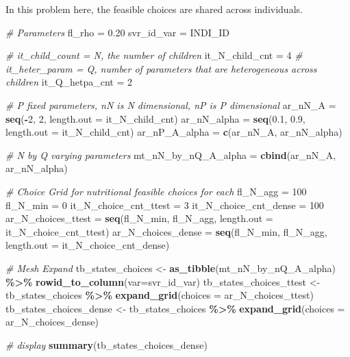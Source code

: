 \documentclass[
]{book}
\newenvironment{Shaded}{\begin{snugshade}}{\end{snugshade}}
\newcommand{\CommentTok}[1]{\textcolor[rgb]{0.56,0.35,0.01}{\textit{#1}}}
\newcommand{\DataTypeTok}[1]{\textcolor[rgb]{0.13,0.29,0.53}{#1}}
\newcommand{\DecValTok}[1]{\textcolor[rgb]{0.00,0.00,0.81}{#1}}
\newcommand{\FloatTok}[1]{\textcolor[rgb]{0.00,0.00,0.81}{#1}}
\newcommand{\KeywordTok}[1]{\textcolor[rgb]{0.13,0.29,0.53}{\textbf{#1}}}
\newcommand{\NormalTok}[1]{#1}
\newcommand{\OperatorTok}[1]{\textcolor[rgb]{0.81,0.36,0.00}{\textbf{#1}}}
\newcommand{\StringTok}[1]{\textcolor[rgb]{0.31,0.60,0.02}{#1}}
\begin{document}
In this problem here, the feasible choices are shared across individuals.

\begin{Shaded}
\begin{Highlighting}[]
\CommentTok{\# Parameters}
\NormalTok{fl\_rho =}\StringTok{ }\FloatTok{0.20}
\NormalTok{svr\_id\_var =}\StringTok{ \textquotesingle{}INDI\_ID\textquotesingle{}}

\CommentTok{\# it\_child\_count = N, the number of children}
\NormalTok{it\_N\_child\_cnt =}\StringTok{ }\DecValTok{4}
\CommentTok{\# it\_heter\_param = Q, number of parameters that are heterogeneous across children}
\NormalTok{it\_Q\_hetpa\_cnt =}\StringTok{ }\DecValTok{2}

\CommentTok{\# P fixed parameters, nN is N dimensional, nP is P dimensional}
\NormalTok{ar\_nN\_A =}\StringTok{ }\KeywordTok{seq}\NormalTok{(}\OperatorTok{{-}}\DecValTok{2}\NormalTok{, }\DecValTok{2}\NormalTok{, }\DataTypeTok{length.out =}\NormalTok{ it\_N\_child\_cnt)}
\NormalTok{ar\_nN\_alpha =}\StringTok{ }\KeywordTok{seq}\NormalTok{(}\FloatTok{0.1}\NormalTok{, }\FloatTok{0.9}\NormalTok{, }\DataTypeTok{length.out =}\NormalTok{ it\_N\_child\_cnt)}
\NormalTok{ar\_nP\_A\_alpha =}\StringTok{ }\KeywordTok{c}\NormalTok{(ar\_nN\_A, ar\_nN\_alpha)}

\CommentTok{\# N by Q varying parameters}
\NormalTok{mt\_nN\_by\_nQ\_A\_alpha =}\StringTok{ }\KeywordTok{cbind}\NormalTok{(ar\_nN\_A, ar\_nN\_alpha)}

\CommentTok{\# Choice Grid for nutritional feasible choices for each}
\NormalTok{fl\_N\_agg =}\StringTok{ }\DecValTok{100}
\NormalTok{fl\_N\_min =}\StringTok{ }\DecValTok{0}
\NormalTok{it\_N\_choice\_cnt\_ttest =}\StringTok{ }\DecValTok{3}
\NormalTok{it\_N\_choice\_cnt\_dense =}\StringTok{ }\DecValTok{100}
\NormalTok{ar\_N\_choices\_ttest =}\StringTok{ }\KeywordTok{seq}\NormalTok{(fl\_N\_min, fl\_N\_agg, }\DataTypeTok{length.out =}\NormalTok{ it\_N\_choice\_cnt\_ttest)}
\NormalTok{ar\_N\_choices\_dense =}\StringTok{ }\KeywordTok{seq}\NormalTok{(fl\_N\_min, fl\_N\_agg, }\DataTypeTok{length.out =}\NormalTok{ it\_N\_choice\_cnt\_dense)}

\CommentTok{\# Mesh Expand}
\NormalTok{tb\_states\_choices \textless{}{-}}\StringTok{ }\KeywordTok{as\_tibble}\NormalTok{(mt\_nN\_by\_nQ\_A\_alpha) }\OperatorTok{\%\textgreater{}\%}\StringTok{ }\KeywordTok{rowid\_to\_column}\NormalTok{(}\DataTypeTok{var=}\NormalTok{svr\_id\_var)}
\NormalTok{tb\_states\_choices\_ttest \textless{}{-}}\StringTok{ }\NormalTok{tb\_states\_choices }\OperatorTok{\%\textgreater{}\%}\StringTok{ }\KeywordTok{expand\_grid}\NormalTok{(}\DataTypeTok{choices =}\NormalTok{ ar\_N\_choices\_ttest)}
\NormalTok{tb\_states\_choices\_dense \textless{}{-}}\StringTok{ }\NormalTok{tb\_states\_choices }\OperatorTok{\%\textgreater{}\%}\StringTok{ }\KeywordTok{expand\_grid}\NormalTok{(}\DataTypeTok{choices =}\NormalTok{ ar\_N\_choices\_dense)}

\CommentTok{\# display}
\KeywordTok{summary}\NormalTok{(tb\_states\_choices\_dense)}
\end{Highlighting}
\end{Shaded}
\end{document}
